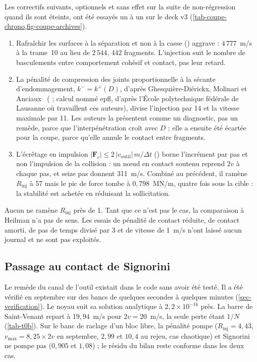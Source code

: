 Les correctifs suivants, optionnels et sans effet sur la suite de non-régression quand ils sont éteints, ont été essayés un à un sur le deck v3 (\cref{tab-coupe-chrono,fig-coupe-archives}).
\begin{enumerate}
\item Rafraîchir les surfaces à la séparation et non à la casse () aggrave : $4\,777$~m/s à la trame~10 au lieu de $2\,544$, 442 fragments. L'injection suit le nombre de basculements entre comportement cohésif et contact, pas leur retard.
\item La pénalité de compression des joints proportionnelle à la sécante d'endommagement, $k^- = k^+(D)$, d'après Ghesquière-Diérickx, Molinari et Anciaux~\cite{ghesquiere2025} ( ; calcul nommé epfl, d'après l'École polytechnique fédérale de Lausanne où travaillent ces auteurs), divise l'injection par 14 et la vitesse maximale par 11. Les auteurs la présentent comme un diagnostic, pas un remède, parce que l'interpénétration croît avec $D$ ; elle a ensuite été écartée pour la coupe, parce qu'elle annule le contact entre fragments.
\item L'écrêtage en impulsion $|\mathbf F_c| \leq 2\,|v_\text{outil}|\,m/\Delta t$ () borne l'incrément par pas et non l'impulsion de la collision : un nœud en contact soutenu reprend $2v$ à chaque pas, et seize pas donnent 311~m/s. Combiné au précédent, il ramène $R_\text{inj}$ à 57 mais le pic de force tombe à $0{,}798$~MN/m, quatre fois sous la cible : la stabilité est achetée en réduisant la sollicitation.
\end{enumerate}
Aucun ne ramène $R_\text{inj}$ près de 1. Tant que ce n'est pas le cas, la comparaison à Heilman n'a pas de sens. Les essais de pénalité de contact réduite, de contact amorti, de pas de temps divisé par 3 et de vitesse de 1~m/s n'ont laissé aucun journal et ne sont pas exploités.

\subsection{Passage au contact de Signorini}

Le remède du canal de l'outil existait dans le code sans avoir été testé. Il a été vérifié en septembre sur des bancs de quelques secondes à quelques minutes (\cref{sec-verification}). Le noyau suit sa solution analytique à $2{,}2\times10^{-16}$ près. La barre de Saint-Venant repart à $19{,}94$~m/s pour $2v = 20$~m/s, la seule perte étant $1/N$ (\cref{tab-t0b}). Sur le banc de raclage d'un bloc libre, la pénalité pompe ($R_\text{inj} = 4{,}43$, $v_\text{max} = 8{,}25 \times 2v$ en septembre, $2{,}99$ et $10{,}4$ au rejeu, cas chaotique) et Signorini ne pompe pas ($0{,}905$ et $1{,}08$) ; le résidu du bilan reste conforme dans les deux cas.

